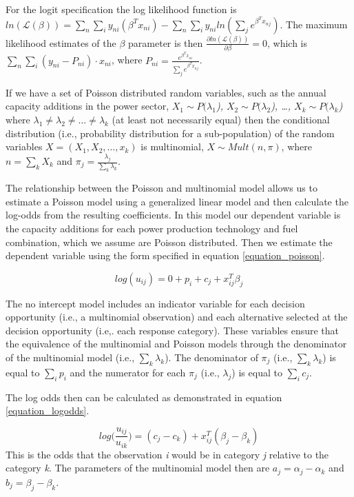 \documentclass[10pt]{amsart}
\begin{document}
For the logit specification the log likelihood function is $ln(\mathcal{L(\beta)})= \sum_{n} \sum_{i} y_{ni}\left(\beta^{T} x_{ni}\right) - \sum_{n} \sum_{i} y_{ni} ln\left(\sum_{j}e^{\beta^{T}x_{nj}}\right)$.
The maximum likelihood estimates of the $\beta$ parameter is then $\frac{\partial ln\left(\mathcal{L(\beta)}\right)}{\partial \beta} = 0$, which is $\sum_{n}\sum_{i} \left(y_{ni} - P_{ni}\right)\cdot x_{ni}$, where $P_{ni} = \frac{e^{\beta^{T}x_{ni}}}{\sum_{j} e^{\beta^{T}x_{nj}}}$.

If we have a set of Poisson distributed random variables, such as the annual capacity additions in the power sector, \textit{$X_1 \sim P(\lambda_1$), $X_2 \sim P(\lambda_2$), \ldots, $X_k \sim P(\lambda_k$)} where $\lambda_1 \neq \lambda_2 \neq \ldots \neq \lambda_k$ (at least not necessarily equal) then the conditional distribution (i.e., probability distribution for a sub-population) of the random variables \textit{$X = (X_1, X_2, \ldots, x_k)$} is multinomial, $X \sim Mult(n, \pi)$, where \textit{$n = \sum_k X_k$} and \textit{$\pi_j = \frac{\lambda_j}{\sum_k \lambda_k}$}. 

The relationship between the Poisson and multinomial model allows us to estimate a Poisson model using a generalized linear model and then calculate the log-odds from the resulting coefficients. 
In this model our dependent variable is the capacity additions for each power production technology and fuel combination, which we assume are Poisson distributed.
Then we estimate the dependent variable using the form specified in equation \ref{equation_poisson}.

\begin{equation}\label{equation_poisson}
log(u_{ij}) = 0 + p_i + c_j + x_{ij}^T\beta_j 
\end{equation}

The no intercept model includes an indicator variable for each decision opportunity (i.e., a multinomial observation) and each alternative selected at the decision opportunity (i.e,. each response category).
These variables ensure that the equivalence of the multinomial and Poisson models through the denominator of the multinomial model (i.e., $\sum_k \lambda_k$). 
The denominator of $\pi_j$ (i.e., $\sum_k \lambda_k$) is equal to $\sum_i p_i$ and the numerator for each $\pi_j$ (i.e., $\lambda_j$) is equal to $\sum_i c_j$.

The log odds then can be calculated as demonstrated in equation \ref{equation_logodds}.

\begin{equation}
log\Big(\frac{u_{ij}}{u_{ik}}\Big) = (c_j-c_k) + x_{ij}^T(\beta_j - \beta_k)
\end{equation}
This is the odds that the observation \textit{i} would be in category \textit{j} relative to the category \textit{k}.
The parameters of the multinomial model then are $a_j = \alpha_j - \alpha_k$ and $b_j = \beta_j -\beta_k$. 
\end{document}
